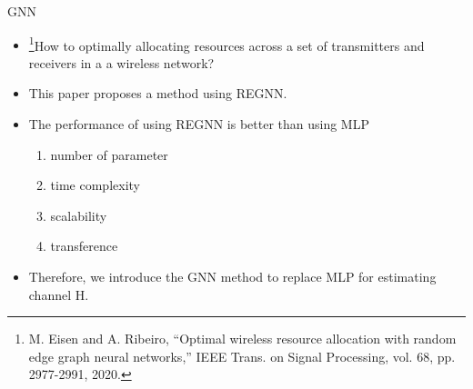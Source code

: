 \documentclass[hyperref={bookmarks=false}]{beamer}
\numberwithin{figure}{section}
\begin{document}
\begin{frame}{GNN}
\begin{itemize}
    \item \footnote{M. Eisen and A. Ribeiro, “Optimal wireless resource allocation with random edge graph neural networks,” IEEE Trans. on
    Signal Processing, vol. 68, pp. 2977-2991, 2020.}How to optimally allocating resources across a set of transmitters and receivers in a a wireless network?
    \item This paper proposes a method using REGNN.
    \item The performance of using REGNN is better than using MLP
        \begin{enumerate}
            \item number of parameter
            \item time complexity
            \item scalability
            \item transference
        \end{enumerate}
    \item Therefore, we introduce the GNN method to replace MLP for estimating channel H.
\end{itemize}
    
\end{frame}
\end{document}
